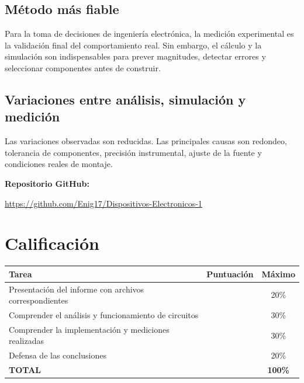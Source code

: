 \documentclass[a4paper,12pt]{article}
\renewcommand{\arraystretch}{1.4}
\begin{document}
	\subsection*{Método más fiable}
	
	Para la toma de decisiones de ingeniería electrónica, la medición experimental es la validación final del
	comportamiento real. Sin embargo, el cálculo y la simulación son indispensables para prever
	magnitudes, detectar errores y seleccionar componentes antes de construir.
	
	\subsection*{Variaciones entre análisis, simulación y medición}
	
	Las variaciones observadas son reducidas. Las principales causas son redondeo, tolerancia de
	componentes, precisión instrumental, ajuste de la fuente y condiciones reales de montaje.
	
	
	
	
	
	
	\begin{center}
		
		\vspace{0.5cm}
		
		\textbf{Repositorio GitHub:}
		
		\url{https://github.com/Enig17/Dispositivos-Electronicos-1}
	\end{center}
	
	
	
	
	\newpage
	\section*{Calificación}		
	\begin{table}[h]
		\centering
		\renewcommand{\arraystretch}{1.5} %
		\begin{tabular}{|l|c|c|}
			\hline
			\textbf{Tarea} & \textbf{Puntuación} & \textbf{Máximo} \\ \hline
			Presentación del informe con archivos correspondientes & & 20\% \\ \hline
			Comprender el análisis y funcionamiento de circuitos & & 30\% \\ \hline
			Comprender la implementación y mediciones realizadas & & 30\% \\ \hline
			Defensa de las conclusiones & & 20\% \\ \hline
			\textbf{TOTAL} & & \textbf{100\%} \\ \hline
		\end{tabular}
	\end{table}
	
	
\end{document}
